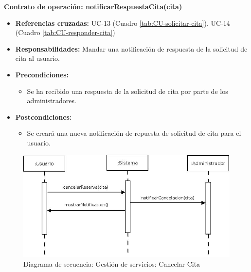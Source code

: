 \textbf{Contrato de operación: notificarRespuestaCita(cita)}
\begin{itemize}
\item \textbf{Referencias cruzadas:} UC-13 (Cuadro \ref{tab:CU-solicitar-cita}), UC-14 (Cuadro \ref{tab:CU-responder-cita})
\item \textbf{Responsabilidades:} Mandar una notificación de respuesta de la solicitud de cita al usuario.
\item \textbf{Precondiciones:} 
 \begin{itemize}
\item Se ha recibido una respuesta de la solicitud de cita por parte de los administradores.
\end {itemize}
\item \textbf{Postcondiciones:} 
 \begin{itemize}
\item Se creará una nueva notificación de repuesta de solicitud de cita para el usuario.
\end {itemize}
\end {itemize}


\vspace{7mm}
\dotfill
\vspace{7mm}

\begin{figure}[h!]
\centering
  \includegraphics[scale=.50]{img/secuencias/gestion-servicios-cancelar-cita-por-parte-de-usuario.jpeg}
  \caption{Diagrama de secuencia: Gestión de servicios: Cancelar Cita}
  \label{fig:secuencia-gestion-servicios-cancelar-cita-por-parte-de-usuario}
\end{figure}

